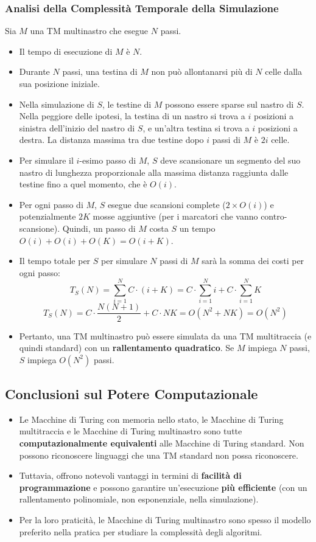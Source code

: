 \documentclass[a4paper]{article}
\theoremstyle{definition} %
\begin{document}
\subsubsection{Analisi della Complessità Temporale della Simulazione}
Sia $M$ una TM multinastro che esegue $N$ passi.
\begin{itemize}
    \item Il tempo di esecuzione di $M$ è $N$.
    \item Durante $N$ passi, una testina di $M$ non può allontanarsi più di $N$ celle dalla sua posizione iniziale.
    \item Nella simulazione di $S$, le testine di $M$ possono essere sparse sul nastro di $S$. Nella peggiore delle ipotesi, la testina di un nastro si trova a $i$ posizioni a sinistra dell'inizio del nastro di $S$, e un'altra testina si trova a $i$ posizioni a destra. La distanza massima tra due testine dopo $i$ passi di $M$ è $2i$ celle.
    \item Per simulare il $i$-esimo passo di $M$, $S$ deve scansionare un segmento del suo nastro di lunghezza proporzionale alla massima distanza raggiunta dalle testine fino a quel momento, che è $O(i)$.
    \item Per ogni passo di $M$, $S$ esegue due scansioni complete ($2 \times O(i)$) e potenzialmente $2K$ mosse aggiuntive (per i marcatori che vanno contro-scansione). Quindi, un passo di $M$ costa $S$ un tempo $O(i) + O(i) + O(K) = O(i+K)$.
    \item Il tempo totale per $S$ per simulare $N$ passi di $M$ sarà la somma dei costi per ogni passo:
    \[
    T_S(N) = \sum_{i=1}^{N} C \cdot (i + K) = C \cdot \sum_{i=1}^{N} i + C \cdot \sum_{i=1}^{N} K
    \]
    \[
    T_S(N) = C \cdot \frac{N(N+1)}{2} + C \cdot NK = O(N^2 + NK) = O(N^2)
    \]
    \item Pertanto, una TM multinastro può essere simulata da una TM multitraccia (e quindi standard) con un \textbf{rallentamento quadratico}. Se $M$ impiega $N$ passi, $S$ impiega $O(N^2)$ passi.
\end{itemize}

\subsection{Conclusioni sul Potere Computazionale}
\begin{itemize}
    \item Le Macchine di Turing con memoria nello stato, le Macchine di Turing multitraccia e le Macchine di Turing multinastro sono tutte \textbf{computazionalmente equivalenti} alle Macchine di Turing standard. Non possono riconoscere linguaggi che una TM standard non possa riconoscere.
    \item Tuttavia, offrono notevoli vantaggi in termini di \textbf{facilità di programmazione} e possono garantire un'esecuzione \textbf{più efficiente} (con un rallentamento polinomiale, non esponenziale, nella simulazione).
    \item Per la loro praticità, le Macchine di Turing multinastro sono spesso il modello preferito nella pratica per studiare la complessità degli algoritmi.
\end{itemize}
\end{document}

